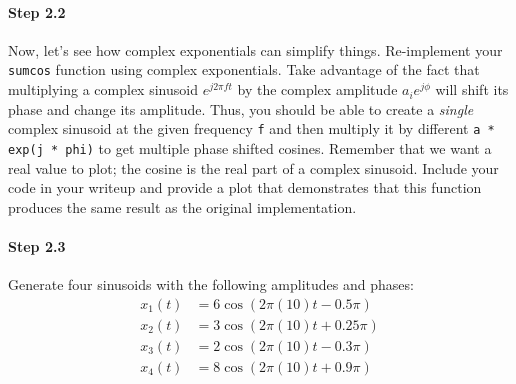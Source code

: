 \paragraph{Step 2.2} Now, let's see how complex exponentials can
simplify things. Re-implement your \texttt{sumcos} function using
complex exponentials. Take advantage of the fact that multiplying a
complex sinusoid $e^{j2\pi f t}$ by the complex amplitude
$a_ie^{j\phi}$ will shift its phase and change its amplitude. Thus,
you should be able to create a \emph{single} complex sinusoid at the
given frequency \texttt{f} and then multiply it by different \texttt{a
  * exp(j * phi)} to get multiple phase shifted cosines. Remember that
we want a real value to plot; the cosine is the real part of a complex
sinusoid. Include your code in your writeup and provide a plot that
demonstrates that this function produces the same result as the
original implementation.


\paragraph{Step 2.3} Generate four sinusoids with the following
amplitudes and phases:
\begin{align}
x_1(t) &= 6 \cos(2\pi(10)t - 0.5\pi) \\
x_2(t) &= 3 \cos(2\pi(10)t + 0.25\pi) \\
x_3(t) &= 2 \cos(2\pi(10)t - 0.3\pi) \\
x_4(t) &= 8 \cos(2\pi(10)t + 0.9\pi) 
\end{align}

